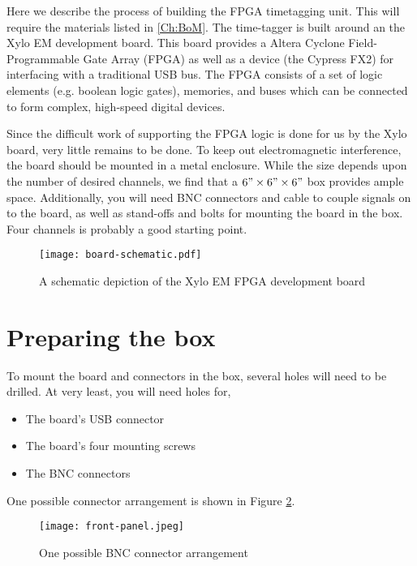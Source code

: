 Here we describe the process of building the FPGA timetagging
unit. This will require the materials listed in \ref{Ch:BoM}.  The
time-tagger is built around an the Xylo EM development board. This
board provides a Altera Cyclone Field-Programmable Gate Array (FPGA)
as well as a device (the Cypress FX2) for interfacing with a
traditional USB bus. The FPGA consists of a set of logic elements
(e.g. boolean logic gates), memories, and buses which can be connected
to form complex, high-speed digital devices.

Since the difficult work of supporting the FPGA logic is done for us
by the Xylo board, very little remains to be done. To keep out
electromagnetic interference, the board should be mounted in a metal
enclosure. While the size depends upon the number of desired channels,
we find that a $6"\times6"\times6"$ box provides ample
space. Additionally, you will need BNC connectors and cable to couple
signals on to the board, as well as stand-offs and bolts for mounting
the board in the box. Four channels is probably a good starting point.

\begin{figure}
  \center
  \texttt{[image: board-schematic.pdf]}
  \caption{A schematic depiction of the Xylo EM FPGA development board}
  \label{fig:board-schematic}
\end{figure}

\section{Preparing the box}

To mount the board and connectors in the box, several holes will need
to be drilled. At very least, you will need holes for,

\begin{itemize}
  \item The board's USB connector
  \item The board's four mounting screws 
  \item The BNC connectors
\end{itemize}

One possible connector arrangement is shown in Figure
\ref{fig:front-panel}.

\begin{figure}
  \center
  \texttt{[image: front-panel.jpeg]}
  \caption{One possible BNC connector arrangement}
  \label{fig:front-panel}
\end{figure}

